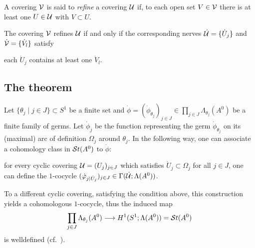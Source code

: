\begin{defn}
  A covering $\mathcal{V}$ is said to \emph{refine} a covering $\mathcal{U}$ if, to each open
  set $V\in\mathcal{V}$ there is at least one $U\in\mathcal{U}$ with $V\subset U$.
\end{defn}
\begin{prop}
  The covering $\mathcal{V}$ refines $\mathcal{U}$ if and only if the corresponding nerves
  $\dot{\mathcal{U}}=\{\dot U_j\}$ and $\dot{\mathcal{V}}=\{\dot V_l\}$ satisfy
  \begin{einr}
    each $\dot U_j$ contains at least one $\dot V_l$.
  \end{einr}
\end{prop}

\subsection{The theorem}
Let $\{\theta_j\mid j\in J\}\subset S^1$ be a finite set and
$\dot\phi=(\dot\phi_{\theta_j})_{j\in J}
\in\prod_{j\in J}\Lambda_{\theta_j}(A^0)$ be a finite family of germs.
Let $\dot\phi_j$ be the function representing the germ $\dot\phi_{\theta_j}$
on its (maximal) arc of definition $\Omega_j$ around $\theta_j$.
In the following way, one can associate a cohomology class in $\mathcal{S}{}t(A^0)$ to
$\dot\phi$:
\begin{einr}
  for every cyclic covering $\mathcal{U}=(U_j)_{j\in J}$ which satisfies
  $\dot U_j\subset\Omega_j$ for all $j\in J$, one can define the $1$-cocycle
  $(\dot{\varphi}_{j|\dot U_j})_{j\in J}\in\Gamma(\dot{\mathcal{U}};\Lambda(A^0))$.
\end{einr}
To a different cyclic covering, satisfying the condition above, this
construction yields a cohomologous $1$-cocycle, thus the induced map
\begin{equation}\label{eq:mapStoToCocy}
  \prod_{j\in J}\Lambda_{\theta_j}(A^0)
  \longrightarrow
  H^1(S^1;\Lambda(A^0))=\mathcal{S}{}t(A^0)
\end{equation}
is welldefined (cf.\ \cite[868]{Loday1994}).
